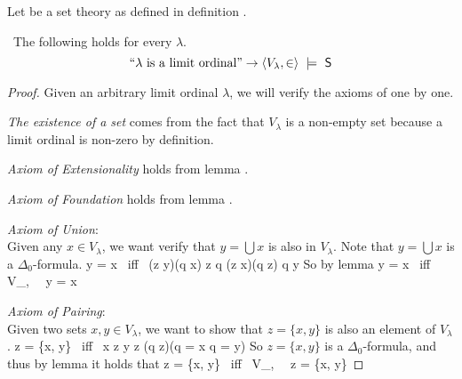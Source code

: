 Let  be a set theory as defined in definition . 
\begin{lemma}\label{lemma:scm_s_is_limit}\
The following holds for every $\lambda$.
\begin{equation}
\mbox{``$\lambda$ is a limit ordinal''} \then \langle V_\lambda, \in \rangle~\models~\sf{S} %
\end{equation}
\end{lemma}

\begin{proof}
Given an arbitrary limit ordinal $\lambda$, we will verify the axioms of  one by one.
\bce[(i)]
\item \emph{The existence of a set} comes from the fact that $V_\lambda$ is a non-empty set because a limit ordinal is non-zero by definition.

\item \emph{\emph{Axiom of Extensionality}} holds from lemma .

\item \emph{Axiom of Foundation} holds from lemma .

\item \emph{Axiom of Union}:\\ %
Given any $x \in V_\lambda$, we want verify that $y = \bigcup x$ is also in $V_\lambda$. Note that $y = \bigcup x$ is a $\Delta_0$-formula.
\beq
y = \bigcup x \mbox{ iff } (\forall z \in y)(\exists q \in x) z \in q \et (\forall z \in x)(\forall q \in z) q \in y
\eeq
So by lemma 
\beq
y = \bigcup x \mbox{ iff } \langle V_\lambda, \in \rangle~\models~y = \bigcup x
\eeq

\item \emph{Axiom of Pairing}: \\ %
Given two sets $x, y \in V_\lambda$, we want to show that $z = \{x, y\}$ is also an element of $V_\lambda$.
\beq
z = \{x, y\} \mbox{ iff } x \in z \et y \in z \et (\forall q \in z)(q = x \lor q = y)
\eeq
So $z = \{x, y\}$ is a $\Delta_0$-formula, and thus by lemma  it holds that
\beq
z = \{x, y\} \mbox{ iff } \langle V_\lambda, \in \rangle~\models~z = \{x, y\}
\eeq



\end{proof}

